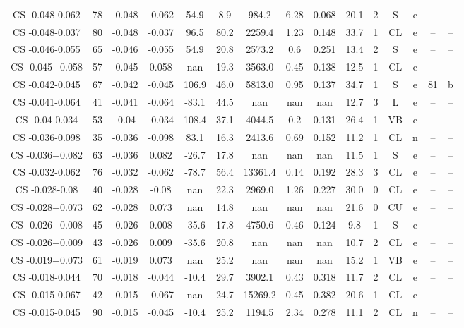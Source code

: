 \begin{table}
\begin{tabular}{ccccccccccccccc}
CS -0.048-0.062 & 78 & -0.048 & -0.062 & 54.9 & 8.9 & 984.2 & 6.28 & 0.068 & 20.1 & 2 & S & e & -- & -- \\
CS -0.048-0.037 & 80 & -0.048 & -0.037 & 96.5 & 80.2 & 2259.4 & 1.23 & 0.148 & 33.7 & 1 & CL & e & -- & -- \\
CS -0.046-0.055 & 65 & -0.046 & -0.055 & 54.9 & 20.8 & 2573.2 & 0.6 & 0.251 & 13.4 & 2 & S & e & -- & -- \\
CS -0.045+0.058 & 57 & -0.045 & 0.058 & nan & 19.3 & 3563.0 & 0.45 & 0.138 & 12.5 & 1 & CL & e & -- & -- \\
CS -0.042-0.045 & 67 & -0.042 & -0.045 & 106.9 & 46.0 & 5813.0 & 0.95 & 0.137 & 34.7 & 1 & S & e & 81 & b \\
CS -0.041-0.064 & 41 & -0.041 & -0.064 & -83.1 & 44.5 & nan & nan & nan & 12.7 & 3 & L & e & -- & -- \\
CS -0.04-0.034 & 53 & -0.04 & -0.034 & 108.4 & 37.1 & 4044.5 & 0.2 & 0.131 & 26.4 & 1 & VB & e & -- & -- \\
CS -0.036-0.098 & 35 & -0.036 & -0.098 & 83.1 & 16.3 & 2413.6 & 0.69 & 0.152 & 11.2 & 1 & CL & n & -- & -- \\
CS -0.036+0.082 & 63 & -0.036 & 0.082 & -26.7 & 17.8 & nan & nan & nan & 11.5 & 1 & S & e & -- & -- \\
CS -0.032-0.062 & 76 & -0.032 & -0.062 & -78.7 & 56.4 & 13361.4 & 0.14 & 0.192 & 28.3 & 3 & CL & e & -- & -- \\
CS -0.028-0.08 & 40 & -0.028 & -0.08 & nan & 22.3 & 2969.0 & 1.26 & 0.227 & 30.0 & 0 & CL & e & -- & -- \\
CS -0.028+0.073 & 62 & -0.028 & 0.073 & nan & 14.8 & nan & nan & nan & 21.6 & 0 & CU & e & -- & -- \\
CS -0.026+0.008 & 45 & -0.026 & 0.008 & -35.6 & 17.8 & 4750.6 & 0.46 & 0.124 & 9.8 & 1 & S & e & -- & -- \\
CS -0.026+0.009 & 43 & -0.026 & 0.009 & -35.6 & 20.8 & nan & nan & nan & 10.7 & 2 & CL & e & -- & -- \\
CS -0.019+0.073 & 61 & -0.019 & 0.073 & nan & 25.2 & nan & nan & nan & 15.2 & 1 & VB & e & -- & -- \\
CS -0.018-0.044 & 70 & -0.018 & -0.044 & -10.4 & 29.7 & 3902.1 & 0.43 & 0.318 & 11.7 & 2 & CL & e & -- & -- \\
CS -0.015-0.067 & 42 & -0.015 & -0.067 & nan & 24.7 & 15269.2 & 0.45 & 0.382 & 20.6 & 1 & CL & e & -- & -- \\
CS -0.015-0.045 & 90 & -0.015 & -0.045 & -10.4 & 25.2 & 1194.5 & 2.34 & 0.278 & 11.1 & 2 & CL & n & -- & -- \\

\end{tabular}
\end{table}

